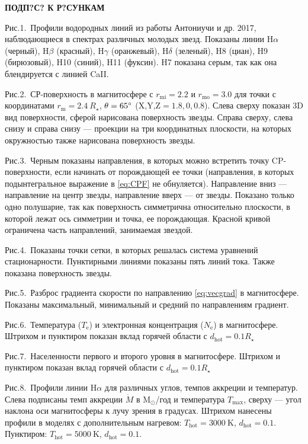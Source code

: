 \documentclass{article}
\begin{document}
\clearpage

\centerline {\bf ПОДП?С? К Р?СУНКАМ}
\vspace{1 cm} 

Рис.1.~Профили водородных линий из работы Антониучи и др. 2017, наблюдающиеся в спектрах различных молодых звезд. Показаны линии $\text{H}\alpha$ (черный), $\text{H}\beta$ (красный), $\text{H}\gamma$ (оранжевый), $\text{H}\delta$ (зеленый), H8 (циан), H9 (бирюзовый), H10 (синий), H11 (фуксин). H7 показана серым, так как она блендируется с линией CaII. 

Рис.2.~СР-поверхность в магнитосфере с $r_\text{mi} = 2.2$ и $r_\text{mo} = 3.0$ для точки с координатами $r_\text{m} = 2.4\ R_\star$, $\theta = 65\degree$ ($\text{X,Y,Z} = 1.8,0,0.8$). Слева сверху показан 3D вид поверхности, сферой нарисована поверхность звезды. Справа сверху, слева снизу и справа снизу --- проекции на три координатных плоскости, на которых окружностью также нарисована поверхность звезды.

Рис.3.~Черным показаны направления, в которых можно встретить точку CP-поверхности, если начинать от порождающей ее точки (направления, в которых подынтегральное выражение в \eqref{eq:CPF} не обнуляется). Направление вниз --- направление на центр звезды, направление вверх --- от звезды. Показано только одно полушарие, так как поверхность симметрична относительно плоскости, в которой лежат ось симметрии и точка, ее порождающая. Красной кривой ограничена часть направлений, занимаемая звездой.

Рис.4.~Показаны точки сетки, в которых решалась система уравнений стационарности. Пунктирными линиями показаны пять линий тока. Также показана поверхность звезды.

Рис.5.~Разброс градиента скорости по направлению \eqref{eq:vecgrad} в магнитосфере. Показаны максимальный, минимальный и средний по направлениям градиент.

Рис.6.~Температура ($T_\text{e}$) и электронная концентрация ($N_\text{e}$) в магнитосфере. Штрихом и пунктиром показан вклад горячей области с $d_\text{hot} = 0.1 R_\star$

Рис.7.~Населенности первого и второго уровня в магнитосфере. Штрихом и пунктиром показан вклад горячей области с $d_\text{hot} = 0.1 R_\star$

Рис.8.~Профили линии $\text{H}\alpha$ для различных углов, темпов аккреции и температур. Слева подписаны темп аккреции $\dot{M}$ в $\text{M}_\odot$/год и температура $T_\text{max}$, сверху --- угол наклона оси магнитосферы к лучу зрения в градусах. Штрихом нанесены профили в моделях с дополнительным нагревом: $T_\text{hot} = 3000\ \text{K}$, $d_\text{hot} = 0.1$. Пунктиром: $T_\text{hot} = 5000\ \text{K}$, $d_\text{hot} = 0.1$.
\end{document}
